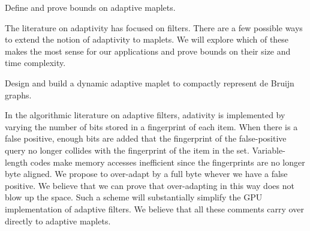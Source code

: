 \begin{rproblem}\label{rprob:adaptive-maplet}
Define and prove bounds on adaptive maplets.
\end{rproblem}
The literature on adaptivity has focused on filters.  There are a few possible ways to extend the notion of adaptivity to maplets.  We will explore which of these makes the most sense for our applications and prove bounds on their size and time complexity.

\begin{rproblem}\label{rprob:dyn-apt-filter}
Design and build a dynamic adaptive maplet to compactly represent de Bruijn graphs.
\end{rproblem}

In the algorithmic literature on adaptive filters, adativity is implemented by varying the number of bits stored in a fingerprint of each item.  When there is a false positive, enough bits are added that the fingerprint of the false-positive query no longer collides with the fingerprint of the item in the set.  Variable-length codes make memory accesses inefficient since the fingerprints are no longer byte aligned.  We propose to over-adapt by a full byte whever we have a false positive.  We believe that we can prove that over-adapting in this way does not blow up the space.  Such a scheme will substantially simplify the GPU implementation of adaptive filters.  We believe that all these comments carry over directly to adaptive maplets.





